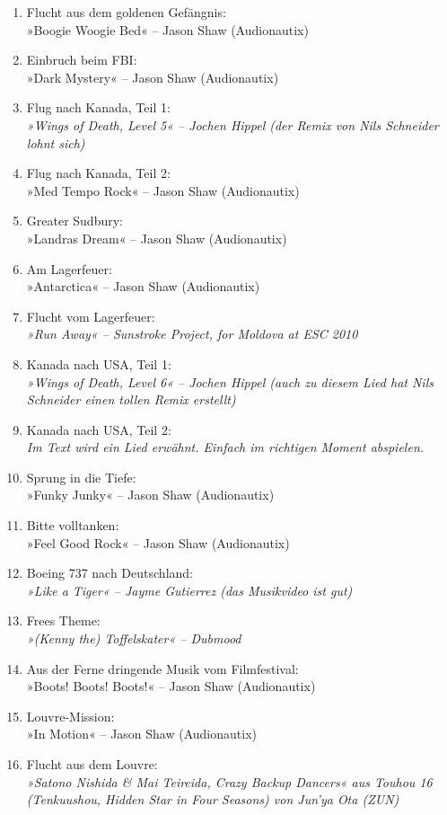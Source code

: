 \begin{enumerate}
    \item Flucht aus dem goldenen Gefängnis:\\ »Boogie Woogie Bed« – Jason Shaw (Audionautix)
    \item Einbruch beim FBI:\\ »Dark Mystery« – Jason Shaw (Audionautix)
    \item Flug nach Kanada, Teil 1:\\ \textit{»Wings of Death, Level 5« – Jochen Hippel (der Remix von Nils Schneider lohnt sich)}
    \item Flug nach Kanada, Teil 2:\\ »Med Tempo Rock« – Jason Shaw (Audionautix)
    \item Greater Sudbury:\\ »Landras Dream« – Jason Shaw (Audionautix)
    \item Am Lagerfeuer:\\ »Antarctica« – Jason Shaw (Audionautix)
    \item Flucht vom Lagerfeuer:\\ \textit{»Run Away« – Sunstroke Project, for Moldova at ESC 2010}
    \item Kanada nach USA, Teil 1:\\ \textit{»Wings of Death, Level 6« – Jochen Hippel (auch zu diesem Lied hat Nils Schneider einen tollen Remix erstellt)}
    \item Kanada nach USA, Teil 2:\\ \textit{Im Text wird ein Lied erwähnt. Einfach im richtigen Moment abspielen.}
    \item Sprung in die Tiefe:\\ »Funky Junky« – Jason Shaw (Audionautix)
    \item Bitte volltanken:\\ »Feel Good Rock« – Jason Shaw (Audionautix)
    \item Boeing 737 nach Deutschland:\\ \textit{»Like a Tiger« – Jayme Gutierrez (das Musikvideo ist gut)}
    \item Frees Theme:\\ \textit{»(Kenny the) Toffelskater« – Dubmood} 
    \item Aus der Ferne dringende Musik vom Filmfestival:\\ »Boots! Boots! Boots!« – Jason Shaw (Audionautix)
    \item Louvre-Mission:\\ »In Motion« – Jason Shaw (Audionautix)
    \item Flucht aus dem Louvre:\\ \textit{»Satono Nishida \& Mai Teireida, Crazy Backup Dancers« aus Touhou 16 (Tenkuushou, Hidden Star in Four Seasons) von Jun'ya Ota (ZUN)}

\end{enumerate}

